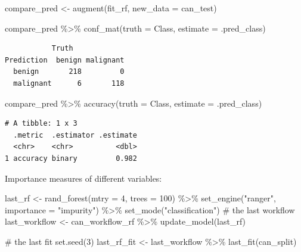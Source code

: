 \documentclass[
  letterpaper,
  DIV=11,
  numbers=noendperiod]{scrreprt}
\newenvironment{Shaded}{\begin{snugshade}}{\end{snugshade}}
\newcommand{\AttributeTok}[1]{\textcolor[rgb]{0.40,0.45,0.13}{#1}}
\newcommand{\CommentTok}[1]{\textcolor[rgb]{0.37,0.37,0.37}{#1}}
\newcommand{\DecValTok}[1]{\textcolor[rgb]{0.68,0.00,0.00}{#1}}
\newcommand{\FunctionTok}[1]{\textcolor[rgb]{0.28,0.35,0.67}{#1}}
\newcommand{\NormalTok}[1]{\textcolor[rgb]{0.00,0.23,0.31}{#1}}
\newcommand{\OtherTok}[1]{\textcolor[rgb]{0.00,0.23,0.31}{#1}}
\newcommand{\SpecialCharTok}[1]{\textcolor[rgb]{0.37,0.37,0.37}{#1}}
\newcommand{\StringTok}[1]{\textcolor[rgb]{0.13,0.47,0.30}{#1}}
\begin{document}
\begin{Shaded}
\begin{Highlighting}[]
\NormalTok{compare\_pred }\OtherTok{\textless{}{-}} \FunctionTok{augment}\NormalTok{(fit\_rf, }\AttributeTok{new\_data =}\NormalTok{ can\_test) }

\NormalTok{compare\_pred }\SpecialCharTok{\%\textgreater{}\%} \FunctionTok{conf\_mat}\NormalTok{(}\AttributeTok{truth =}\NormalTok{ Class, }\AttributeTok{estimate =}\NormalTok{ .pred\_class)}
\end{Highlighting}
\end{Shaded}

\begin{verbatim}
           Truth
Prediction  benign malignant
  benign       218         0
  malignant      6       118
\end{verbatim}

\begin{Shaded}
\begin{Highlighting}[]
\NormalTok{compare\_pred }\SpecialCharTok{\%\textgreater{}\%}  \FunctionTok{accuracy}\NormalTok{(}\AttributeTok{truth =}\NormalTok{ Class, }\AttributeTok{estimate =}\NormalTok{ .pred\_class)}
\end{Highlighting}
\end{Shaded}

\begin{verbatim}
# A tibble: 1 x 3
  .metric  .estimator .estimate
  <chr>    <chr>          <dbl>
1 accuracy binary         0.982
\end{verbatim}

Importance measures of different variables:

\begin{Shaded}
\begin{Highlighting}[]
\NormalTok{last\_rf }\OtherTok{\textless{}{-}} 
  \FunctionTok{rand\_forest}\NormalTok{(}\AttributeTok{mtry =} \DecValTok{4}\NormalTok{, }\AttributeTok{trees =} \DecValTok{100}\NormalTok{) }\SpecialCharTok{\%\textgreater{}\%} 
  \FunctionTok{set\_engine}\NormalTok{(}\StringTok{"ranger"}\NormalTok{,  }\AttributeTok{importance =} \StringTok{"impurity"}\NormalTok{) }\SpecialCharTok{\%\textgreater{}\%} 
  \FunctionTok{set\_mode}\NormalTok{(}\StringTok{"classification"}\NormalTok{)}
\CommentTok{\# the last workflow}
\NormalTok{last\_workflow }\OtherTok{\textless{}{-}} 
\NormalTok{  can\_workflow\_rf }\SpecialCharTok{\%\textgreater{}\%} 
  \FunctionTok{update\_model}\NormalTok{(last\_rf)}

\CommentTok{\# the last fit}
\FunctionTok{set.seed}\NormalTok{(}\DecValTok{3}\NormalTok{)}
\NormalTok{last\_rf\_fit }\OtherTok{\textless{}{-}} 
\NormalTok{  last\_workflow }\SpecialCharTok{\%\textgreater{}\%} 
  \FunctionTok{last\_fit}\NormalTok{(can\_split)}
\end{Highlighting}
\end{Shaded}
\end{document}
